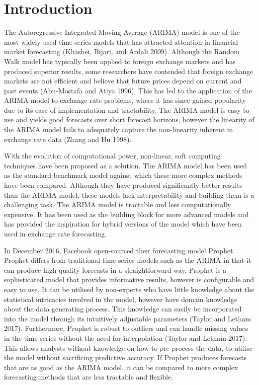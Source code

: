 \documentclass[12pt,a4paper]{article}
\numberwithin{equation}{section}
\numberwithin{figure}{section}
\numberwithin{table}{section}
\begin{document}

\section{\texorpdfstring{Introduction
\label{Introduction}}{Introduction }}\label{introduction}

The Autoregressive Integrated Moving Average (ARIMA) model is one of the
most widely used time series models that has attracted attention in
financial market forecasting (Khashei, Bijari, and Ardali 2009).
Although the Random Walk model has typically been applied to foreign
exchange markets and has produced superior results, some researchers
have contended that foreign exchange markets are not efficient and
believe that future prices depend on current and past events
(Abu-Mostafa and Atiya 1996). This has led to the application of the
ARIMA model to exchange rate problems, where it has since gained
popularity due to its ease of implementation and tractability. The ARIMA
model is easy to use and yields good forecasts over short forecast
horizons, however the linearity of the ARIMA model fails to adequately
capture the non-linearity inherent in exchange rate data (Zhang and Hu
1998).

With the evolution of computational power, non-linear, soft computing
techniques have been proposed as a solution. The ARIMA model has been
used as the standard benchmark model against which these more complex
methods have been compared. Although they have produced significantly
better results than the ARIMA model, these models lack interpretability
and building them is a challenging task. The ARIMA model is tractable
and less computationally expensive. It has been used as the building
block for more advanced models and has provided the inspiration for
hybrid versions of the model which have been used in exchange rate
forecasting.

In December 2016, Facebook open-sourced their forecasting model Prophet.
Prophet differs from traditional time series models such as the ARIMA in
that it can produce high quality forecasts in a straightforward way.
Prophet is a sophisticated model that provides informative results,
however is configurable and easy to use. It can be utilised by
non-experts who have little knowledge about the statistical intricacies
involved in the model, however have domain knowledge about the data
generating process. This knowledge can easily be incorporated into the
model through its intuitively adjustable parameters (Taylor and Letham
2017). Furthermore, Prophet is robust to outliers and can handle missing
values in the time series without the need for interpolation (Taylor and
Letham 2017). This allows analysts without knowledge on how to
pre-process the data, to utilise the model without sacrificing
predictive accuracy. If Prophet produces forecasts that are as good as
the ARIMA model, it can be compared to more complex forecasting methods
that are less tractable and flexible.
\end{document}
